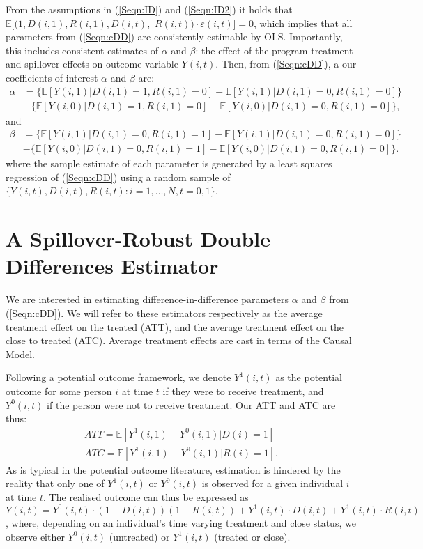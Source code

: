 From the assumptions in (\ref{Seqn:ID}) and (\ref{Seqn:ID2}) it holds that 
$\mathbb{E}[(1,D(i,1),R(i,1),D(i,t),$
$R(i,t))\cdot\varepsilon(i,t)]=0$, which 
implies that all parameters from (\ref{Seqn:cDD}) are consistently estimable 
by OLS.  Importantly, this includes consistent estimates of $\alpha$ and 
$\beta$: the effect of the program treatment and spillover effects on 
outcome variable $Y(i,t)$.  Then, from (\ref{Seqn:cDD}), a our coefficients 
of interest $\alpha$ and $\beta$ are:
\begin{equation}
\nonumber
\label{Seqn:DDa}
\begin{split}
\alpha&=\{\mathbb{E}[Y(i,1)|D(i,1)=1,R(i,1)=0]-\mathbb{E}[Y(i,1)|D(i,1)=0,R(i,1)=0]\} \\
      &-\{\mathbb{E}[Y(i,0)|D(i,1)=1,R(i,1)=0]-\mathbb{E}[Y(i,0)|D(i,1)=0,R(i,1)=0]\}, 
\end{split}
\end{equation}
and 
\begin{equation}
\nonumber
\label{Seqn:DDb}
\begin{split}
\beta&=\{\mathbb{E}[Y(i,1)|D(i,1)=0,R(i,1)=1]-\mathbb{E}[Y(i,1)|D(i,1)=0,R(i,1)=0]\} \\
      &-\{\mathbb{E}[Y(i,0)|D(i,1)=0,R(i,1)=1]-\mathbb{E}[Y(i,0)|D(i,1)=0,R(i,1)=0]\}. 
\end{split}
\end{equation}
where the sample estimate of each parameter is generated by a least squares
regression of (\ref{Seqn:cDD}) using a random sample of 
$\{Y(i,t), D(i,t), R(i,t): i=1, \ldots, N, t=0, 1\}$.

\section{A Spillover-Robust Double Differences Estimator}
\label{Sscn:estim}
We are interested in estimating difference-in-difference parameters $\alpha$ and 
$\beta$ from (\ref{Seqn:cDD}).  We will refer to these estimators respectively
as the average treatment effect on the treated (ATT), and the average treatment
effect on the close to treated (ATC).  Average treatment effects are cast in 
terms of the \citet{Rubin1974} Causal Model.

Following a potential outcome framework, we denote $Y^1(i,t)$ as the potential
outcome for some person $i$ at time $t$ if they were to receive treatment, and
$Y^0(i,t)$ if the person were not to receive treatment.  Our ATT and ATC are
thus:
\begin{eqnarray}
\label{Seqn:estim}
ATT=\mathbb{E}[Y^1(i,1)-Y^0(i,1)|D(i)=1]\  \\
ATC=\mathbb{E}[Y^1(i,1)-Y^0(i,1)|R(i)=1].
\end{eqnarray}
As is typical in the potential outcome literature, estimation is hindered by the
reality that only one of $Y^1(i,t)$ or $Y^0(i,t)$ is observed for a given 
individual $i$ at time $t$.  The realised outcome can thus be expressed as 
$Y(i,t)=Y^0(i,t)\cdot (1-D(i,t))(1-R(i,t))+Y^1(i,t)\cdot D(i,t)+Y^1(i,t)\cdot 
R(i,t)$, where, depending on an individual's time varying treatment and close
status, we observe either $Y^0(i,t)$ (untreated) or $Y^1(i,t)$ (treated or 
close).

